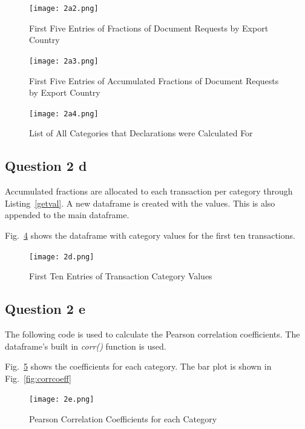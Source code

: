 \documentclass[a4paper,12pt]{article}
\numberwithin{equation}{section}
\numberwithin{figure}{section}
\numberwithin{table}{section}
\begin{document}
\begin{figure}[!htb]
    \centering
    \texttt{[image: 2a2.png]}
    \caption{First Five Entries of Fractions of Document Requests by Export Country}
    \label{fig:2a2}
\end{figure}
\FloatBarrier

\begin{figure}[!htb]
    \centering
    \texttt{[image: 2a3.png]}
    \caption{First Five Entries of Accumulated Fractions of Document Requests by Export Country}
    \label{fig:2a3}
\end{figure}
\FloatBarrier

\begin{figure}[!htb]
    \centering
    \texttt{[image: 2a4.png]}
    \caption{List of All Categories that Declarations were Calculated For}
    \label{fig:2a4}
\end{figure}
\FloatBarrier


\subsection{Question 2 d}

Accumulated fractions are allocated to each transaction per category through Listing~\ref{getval}. A new dataframe is created with the values. This is also appended to the main dataframe. \par 
Fig.~\ref{fig:2d} shows the dataframe with category values for the first ten transactions.

\begin{figure}[!htb]
    \centering
    \texttt{[image: 2d.png]}
    \caption{First Ten Entries of Transaction Category Values}
    \label{fig:2d}
\end{figure}
\FloatBarrier

\subsection{Question 2 e}
The following code is used to calculate the Pearson correlation coefficients. The dataframe's built in \emph{corr()} function is used. 


Fig.~\ref{fig:2e} shows the coefficients for each category. The bar plot is shown in Fig.~\ref{fig:corrcoeff}

\begin{figure}[!htb]
    \centering
    \texttt{[image: 2e.png]}
    \caption{Pearson Correlation Coefficients for each Category}
    \label{fig:2e}
\end{figure}
\FloatBarrier
\end{document}
